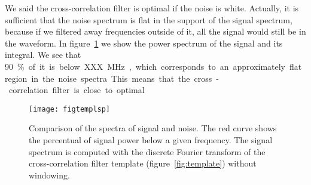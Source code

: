 We said the cross-correlation filter is optimal if the noise is white.
Actually, it is sufficient that the noise spectrum is flat in the support of
the signal spectrum, because if we filtered away frequencies outside of it, all
the signal would still be in the waveform. In figure~\ref{fig:templsp} we show
the power spectrum of the signal and its integral. We see that \SI{90}\% of it
is below XXX~\si{MHz}, which corresponds to an approximately flat region in the
noise spectra. This means that the cross-correlation filter is close to
optimal. 

\begin{figure}
    \hspace{0.00\textwidth}
    \texttt{[image: figtemplsp]}
    
    \caption{Comparison of the spectra of signal and noise. The red curve shows
    the percentual of signal power below a given frequency. The signal spectrum
    is computed with the discrete Fourier transform of the cross-correlation
    filter template (figure~\ref{fig:template}) without windowing.}
    
    \label{fig:templsp}
\end{figure}
